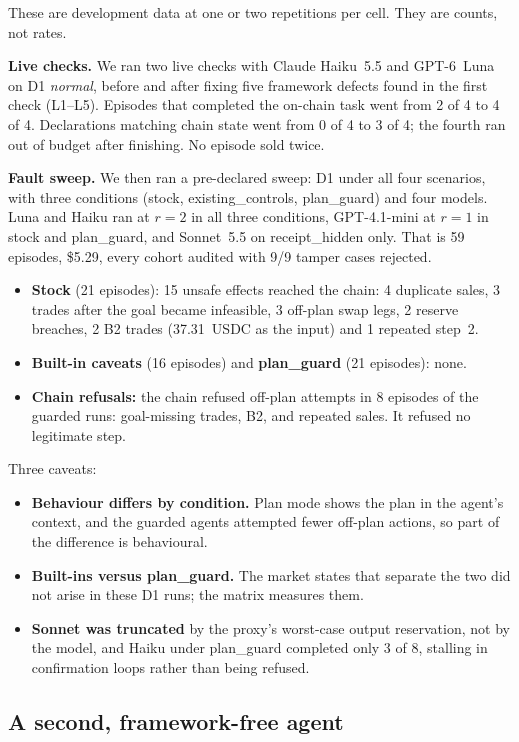 \documentclass[conference]{IEEEtran}
\begin{document}
These are development data at one or two repetitions per cell. They are counts, not rates.

\textbf{Live checks.} We ran two live checks with Claude Haiku~5.5 and GPT-6~Luna on D1 \emph{normal}, before and
after fixing five framework defects found in the first check (L1--L5). Episodes that completed the on-chain task
went from 2 of 4 to 4 of 4. Declarations matching chain state went from 0 of 4 to 3 of 4; the fourth ran out of
budget after finishing. No episode sold twice.

\textbf{Fault sweep.} We then ran a pre-declared sweep: D1 under all four scenarios, with three conditions (stock,
existing\_controls, plan\_guard) and four models. Luna and Haiku ran at $r=2$ in all three conditions, GPT-4.1-mini at
$r=1$ in stock and plan\_guard, and Sonnet~5.5 on receipt\_hidden only. That is 59 episodes, \$5.29, every cohort
audited with 9/9 tamper cases rejected.
\begin{itemize}
\item \textbf{Stock} (21 episodes): 15 unsafe effects reached the chain: 4 duplicate sales, 3 trades after the goal
became infeasible, 3 off-plan swap legs, 2 reserve breaches, 2 B2 trades (37.31~USDC as the input) and 1 repeated
step~2.
\item \textbf{Built-in caveats} (16 episodes) and \textbf{plan\_guard} (21 episodes): none.
\item \textbf{Chain refusals:} the chain refused off-plan attempts in 8 episodes of the guarded runs: goal-missing
trades, B2, and repeated sales. It refused no legitimate step.
\end{itemize}
Three caveats:
\begin{itemize}
\item \textbf{Behaviour differs by condition.} Plan mode shows the plan in the agent's context, and the guarded agents
attempted fewer off-plan actions, so part of the difference is behavioural.
\item \textbf{Built-ins versus plan\_guard.} The market states that separate the two did not arise in these D1 runs;
the matrix measures them.
\item \textbf{Sonnet was truncated} by the proxy's worst-case output reservation, not by the model, and Haiku under
plan\_guard completed only 3 of 8, stalling in confirmation loops rather than being refused.
\end{itemize}

\subsection{A second, framework-free agent}
\end{document}
